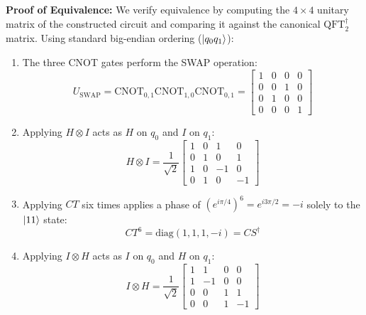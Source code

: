 \documentclass{article}
\begin{document}
\begin{enumerate}[(a)]
    \textbf{Proof of Equivalence:}
    We verify equivalence by computing the $4 \times 4$ unitary matrix of the constructed circuit and comparing it against the canonical $\text{QFT}_2^\dagger$ matrix. Using standard big-endian ordering ($\ket{q_0 q_1}$):
    \begin{enumerate}
        \item The three CNOT gates perform the SWAP operation:
        \[
        U_{\text{SWAP}} = \text{CNOT}_{0,1}\text{CNOT}_{1,0}\text{CNOT}_{0,1} = \begin{bmatrix} 1 & 0 & 0 & 0 \\ 0 & 0 & 1 & 0 \\ 0 & 1 & 0 & 0 \\ 0 & 0 & 0 & 1 \end{bmatrix}
        \]
        \item Applying $H \otimes I$ acts as $H$ on $q_0$ and $I$ on $q_1$:
        \[
        H \otimes I = \frac{1}{\sqrt{2}} \begin{bmatrix} 1 & 0 & 1 & 0 \\ 0 & 1 & 0 & 1 \\ 1 & 0 & -1 & 0 \\ 0 & 1 & 0 & -1 \end{bmatrix}
        \]
        \item Applying $CT$ six times applies a phase of $(e^{i\pi/4})^6 = e^{i 3\pi/2} = -i$ solely to the $\ket{11}$ state:
        \[
        CT^6 = \text{diag}(1, 1, 1, -i) = CS^\dagger
        \]
        \item Applying $I \otimes H$ acts as $I$ on $q_0$ and $H$ on $q_1$:
        \[
        I \otimes H = \frac{1}{\sqrt{2}} \begin{bmatrix} 1 & 1 & 0 & 0 \\ 1 & -1 & 0 & 0 \\ 0 & 0 & 1 & 1 \\ 0 & 0 & 1 & -1 \end{bmatrix}
        \]
    \end{enumerate}


\end{enumerate}
\end{document}
